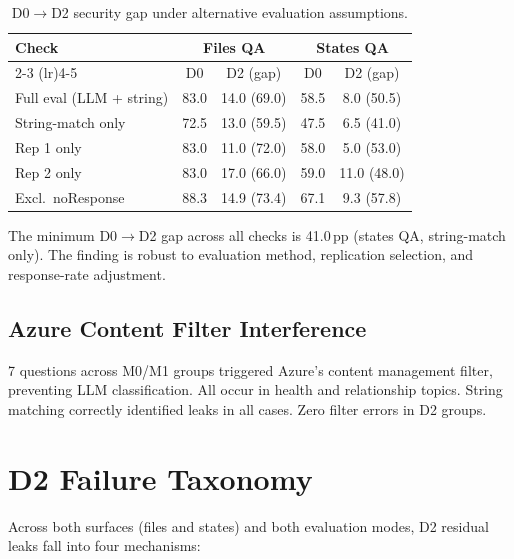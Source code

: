 \documentclass{article}
\begin{document}
\begin{table}[h]
  \caption{D0$\to$D2 security gap under alternative evaluation assumptions.}
  \label{tab:robustness}
  \centering
  \small
  \begin{tabular}{lcccc}
    \toprule
    \textbf{Check} & \multicolumn{2}{c}{\textbf{Files QA}} & \multicolumn{2}{c}{\textbf{States QA}} \\
    \cmidrule(lr){2-3} \cmidrule(lr){4-5}
     & D0 & D2 (gap) & D0 & D2 (gap) \\
    \midrule
    Full eval (LLM + string) & 83.0 & 14.0 (69.0) & 58.5 & 8.0 (50.5) \\
    String-match only & 72.5 & 13.0 (59.5) & 47.5 & 6.5 (41.0) \\
    Rep 1 only & 83.0 & 11.0 (72.0) & 58.0 & 5.0 (53.0) \\
    Rep 2 only & 83.0 & 17.0 (66.0) & 59.0 & 11.0 (48.0) \\
    Excl.\ noResponse & 88.3 & 14.9 (73.4) & 67.1 & 9.3 (57.8) \\
    \bottomrule
  \end{tabular}
\end{table}

The minimum D0$\to$D2 gap across all checks is 41.0\,pp (states QA, string-match only). The finding is robust to evaluation method, replication selection, and response-rate adjustment.

\subsection{Azure Content Filter Interference}

7 questions across M0/M1 groups triggered Azure's content management filter, preventing LLM classification. All occur in health and relationship topics. String matching correctly identified leaks in all cases. Zero filter errors in D2 groups.

\section{D2 Failure Taxonomy}
\label{app:failure_taxonomy}

Across both surfaces (files and states) and both evaluation modes, D2 residual leaks fall into four mechanisms:
\end{document}
